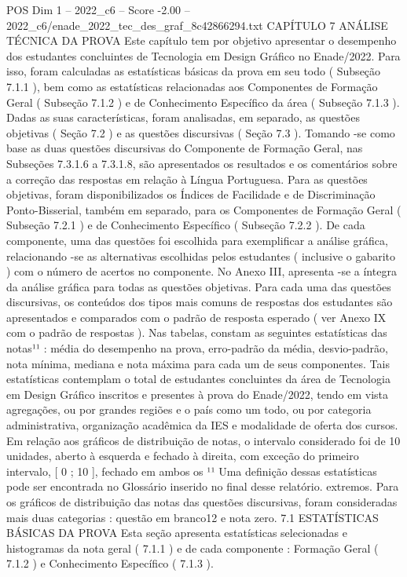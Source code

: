 \begin{textsample}{POS Dim 1 – 2022\_c6 – Score -2.00 – 2022\_c6/enade\_2022\_tec\_des\_graf\_8c42866294.txt}  \label{ex:f1_pos_265}
CAPÍTULO 7 ANÁLISE TÉCNICA DA PROVA Este capítulo tem por objetivo apresentar o desempenho dos estudantes concluintes de Tecnologia em Design Gráfico no Enade/2022.
Para isso, foram calculadas as estatísticas básicas da prova em seu todo ( Subseção 7.1.1 ), bem como as estatísticas relacionadas aos Componentes de Formação Geral ( Subseção 7.1.2 ) e de Conhecimento Específico da área ( Subseção 7.1.3 ).
Dadas as suas características, foram analisadas, em separado, as questões objetivas ( Seção 7.2 ) e as questões discursivas ( Seção 7.3 ).
Tomando -se como base as duas questões discursivas do Componente de Formação Geral, nas Subseções 7.3.1.6 a 7.3.1.8, são apresentados os resultados e os comentários sobre a correção das respostas em relação à Língua Portuguesa.
Para as questões objetivas, foram disponibilizados os Índices de Facilidade e de Discriminação Ponto-Bisserial, também em separado, para os Componentes de Formação Geral ( Subseção 7.2.1 ) e de Conhecimento Específico ( Subseção 7.2.2 ).
De cada componente, uma das questões foi escolhida para exemplificar a análise gráfica, relacionando -se as alternativas escolhidas pelos estudantes ( inclusive o gabarito ) com o número de acertos no componente.
No Anexo III, apresenta -se a íntegra da análise gráfica para todas as questões objetivas.
Para cada uma das questões discursivas, os conteúdos dos tipos mais comuns de respostas dos estudantes são apresentados e comparados com o padrão de resposta esperado ( ver Anexo IX com o padrão de respostas ).
Nas tabelas, constam as seguintes estatísticas das notas¹¹ : média do desempenho na prova, erro-padrão da média, desvio-padrão, nota mínima, mediana e nota máxima para cada um de seus componentes.
Tais estatísticas contemplam o total de estudantes concluintes da área de Tecnologia em Design Gráfico inscritos e presentes à prova do Enade/2022, tendo em vista agregações, ou por grandes regiões e o país como um todo, ou por categoria administrativa, organização acadêmica da IES e modalidade de oferta dos cursos.
Em relação aos gráficos de distribuição de notas, o intervalo considerado foi de 10 unidades, aberto à esquerda e fechado à direita, com exceção do primeiro intervalo, [ 0 ; 10 ], fechado em ambos os ¹¹ Uma definição dessas estatísticas pode ser encontrada no Glossário inserido no final desse relatório. extremos.
Para os gráficos de distribuição das notas das questões discursivas, foram consideradas mais duas categorias : questão em branco12 e nota zero. 7.1 ESTATÍSTICAS BÁSICAS DA PROVA Esta seção apresenta estatísticas selecionadas e histogramas da nota geral ( 7.1.1 ) e de cada componente : Formação Geral ( 7.1.2 ) e Conhecimento Específico ( 7.1.3 ).

\end{textsample}
